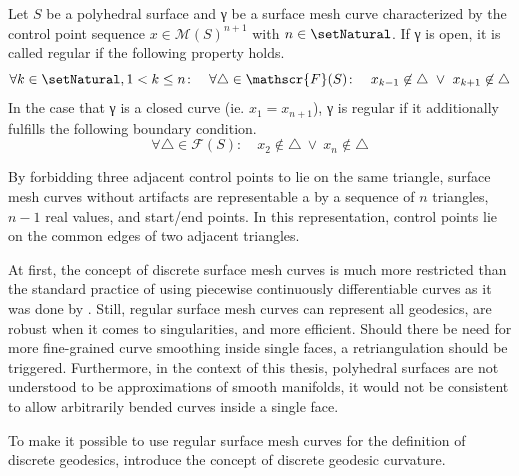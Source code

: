 \documentclass{stdlocal}
\begin{document}
  \begin{definition}
    Let $S$ be a polyhedral surface and γ be a surface mesh curve characterized by the control point sequence $x\in\mathscr{M}(S)^{n+1}$ with $n\in\setNatural$.
    If γ is open, it is called regular if the following property holds.
    \[
      \forall k\in\setNatural, 1 < k \leq n\colon \quad
      \forall \triangle\in\mathscr{F}(S) \colon \quad x_{k-1}\not\in\triangle \ \vee\  x_{k+1}\not\in\triangle
    \]
    In the case that γ is a closed curve (ie. $x_1 = x_{n+1}$), γ is regular if it additionally fulfills the following boundary condition.
    \[
      \forall \triangle\in\mathscr{F}(S) \colon \quad x_{2}\not\in\triangle \ \vee\  x_{n}\not\in\triangle
    \]
  \end{definition}
  By forbidding three adjacent control points to lie on the same triangle, surface mesh curves without artifacts are representable a by a sequence of $n$ triangles, $n-1$ real values, and start/end points.
  In this representation, control points lie on the common edges of two adjacent triangles.

  At first, the concept of discrete surface mesh curves is much more restricted than the standard practice of using piecewise continuously differentiable curves as it was done by \textcite{polthier2006}.
  Still, regular surface mesh curves can represent all geodesics, are robust when it comes to singularities, and more efficient.
  Should there be need for more fine-grained curve smoothing inside single faces, a retriangulation should be triggered.
  Furthermore, in the context of this thesis, polyhedral surfaces are not understood to be approximations of smooth manifolds, it would not be consistent to allow arbitrarily bended curves inside a single face.

  To make it possible to use regular surface mesh curves for the definition of discrete geodesics, \textcite{polthier2006} introduce the concept of discrete geodesic curvature.

\end{document}
